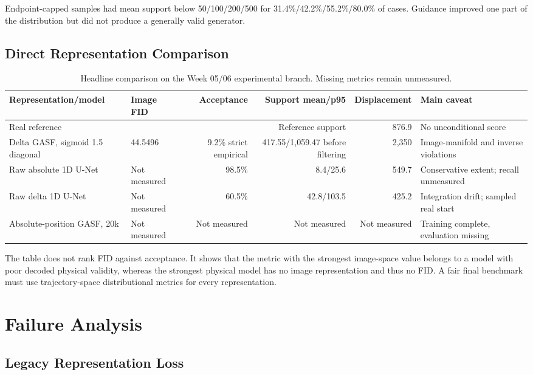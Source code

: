 \documentclass[12pt,a4paper,oneside]{report}
\newcommand{\NA}{\textemdash}
\begin{document}
Endpoint-capped samples had mean support below 50/100/200/500 for 31.4\%/42.2\%/55.2\%/80.0\% of cases. Guidance improved one part of the distribution but did not produce a generally valid generator.

\section{Direct Representation Comparison}

\begin{table}[p]
\centering
\caption{Headline comparison on the Week 05/06 experimental branch. Missing metrics remain unmeasured.}
\label{tab:headline}
\small
\begin{tabular}{L{0.21\textwidth}L{0.15\textwidth}rrrL{0.27\textwidth}}
\toprule
Representation/model & Image FID & Acceptance & Support mean/p95 & Displacement & Main caveat \\
\midrule
Real reference & \NA & \NA & Reference support & 876.9 & No unconditional score \\
Delta GASF, sigmoid 1.5 diagonal & 44.5496 & 9.2\% strict empirical & 417.55/1,059.47 before filtering & 2,350 & Image-manifold and inverse violations \\
Raw absolute 1D U-Net & Not measured & 98.5\% & 8.4/25.6 & 549.7 & Conservative extent; recall unmeasured \\
Raw delta 1D U-Net & Not measured & 60.5\% & 42.8/103.5 & 425.2 & Integration drift; sampled real start \\
Absolute-position GASF, 20k & Not measured & Not measured & Not measured & Not measured & Training complete, evaluation missing \\
\bottomrule
\end{tabular}
\end{table}

The table does not rank FID against acceptance. It shows that the metric with the strongest image-space value belongs to a model with poor decoded physical validity, whereas the strongest physical model has no image representation and thus no FID. A fair final benchmark must use trajectory-space distributional metrics for every representation.

\chapter{Failure Analysis}
\label{chap:failures}

\section{Legacy Representation Loss}
\end{document}
